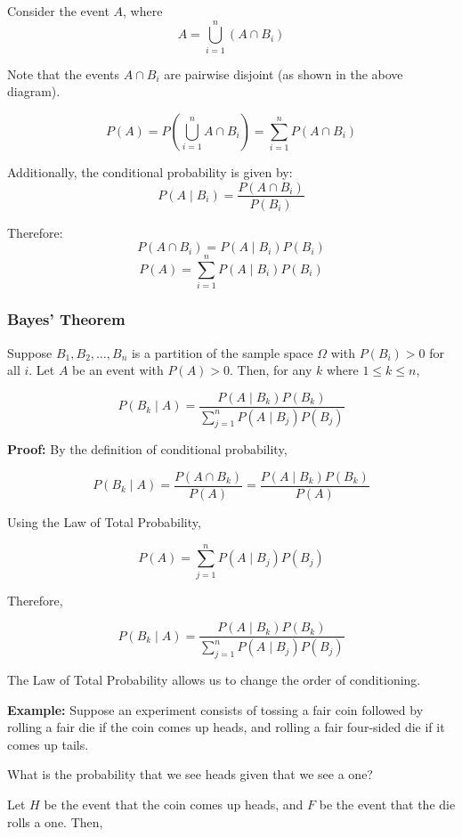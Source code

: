 \documentclass{article}
\begin{document}
    Consider the event \( A \), where 
    \[
        A = \bigcup_{i=1}^{n} (A \cap B_i)
    \]

    Note that the events \( A \cap B_i \) are pairwise disjoint (as shown in the above diagram).

    \[
        P(A) = P\left( \bigcup_{i=1}^{n} A \cap B_i \right) = \sum_{i=1}^{n} P(A \cap B_i)
    \]

    Additionally, the conditional probability is given by:
    \[
        P(A \mid B_i) = \frac{P(A \cap B_i)}{P(B_i)}
    \]

    Therefore:
    \[
        P(A \cap B_i) = P(A \mid B_i) P(B_i)
    \]
    \[
        P(A) = \sum_{i=1}^{n} P(A \mid B_i) P(B_i)
    \]

    \subsubsection*{Bayes' Theorem}
    
    Suppose \( B_1, B_2, \ldots, B_n \) is a partition of the sample space \( \Omega \) with \( P(B_i) > 0 \) for all \( i \). Let \( A \) be an event with \( P(A) > 0 \). Then, for any \( k \) where \( 1 \leq k \leq n \),
    
    \[
        P(B_k \mid A) = \frac{P(A \mid B_k) P(B_k)}{\sum_{j=1}^{n} P(A \mid B_j) P(B_j)}
    \]
    
    \textbf{Proof:} By the definition of conditional probability,
    
    \[
        P(B_k \mid A) = \frac{P(A \cap B_k)}{P(A)} = \frac{P(A \mid B_k) P(B_k)}{P(A)}
    \]
    
    Using the Law of Total Probability,
    
    \[
        P(A) = \sum_{j=1}^{n} P(A \mid B_j) P(B_j)
    \]
    
    Therefore,
    
    \[
        P(B_k \mid A) = \frac{P(A \mid B_k) P(B_k)}{\sum_{j=1}^{n} P(A \mid B_j) P(B_j)}
    \]
    
    The Law of Total Probability allows us to change the order of conditioning.
    
    \textbf{Example:} Suppose an experiment consists of tossing a fair coin followed by rolling a fair die if the coin comes up heads, and rolling a fair four-sided die if it comes up tails.
    
    What is the probability that we see heads given that we see a one?
    
    Let \( H \) be the event that the coin comes up heads, and \( F \) be the event that the die rolls a one. Then,
    
\end{document}
